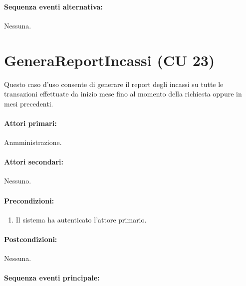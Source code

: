 \documentclass{article}
\begin{document}
	\paragraph{Sequenza eventi alternativa:} Nessuna.

	
	
	
	
	
	
	
	
	
\newpage 
	
	\section*{GeneraReportIncassi (CU 23)}
	
	\indent\indent Questo caso d'uso consente di generare il report degli incassi su tutte le transazioni effettuate da inizio mese fino al momento della richiesta oppure in mesi precedenti.
	
	\paragraph{Attori primari:}Anmministrazione.%
	
	\paragraph{Attori secondari:}Nessuno.
	
	\paragraph{Precondizioni:}
		\begin{enumerate}	[itemsep=8pt,parsep=0pt]
			\item Il sistema ha autenticato l'attore primario.
		\end{enumerate}
	
	\paragraph{Postcondizioni:}Nessuna.
	
	\paragraph{Sequenza eventi principale:}
\end{document}
